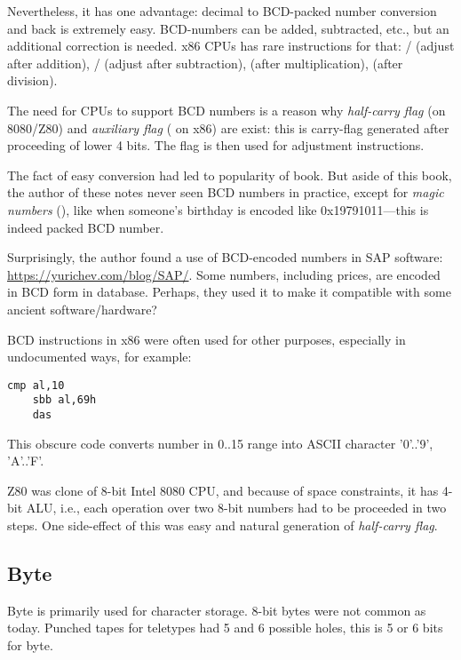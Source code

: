 Nevertheless, it has one advantage: decimal to \ac{BCD}-packed number conversion and back is extremely easy.
BCD-numbers can be added, subtracted, etc., but an additional correction is needed.
x86 CPUs has rare instructions for that:
/ (adjust after addition),
/ (adjust after subtraction),
 (after multiplication),
 (after division).

The need for CPUs to support \ac{BCD} numbers is a reason why \emph{half-carry flag} (on 8080/Z80) and
\emph{auxiliary flag} ( on x86)
are exist: this is carry-flag generated after proceeding of lower 4 bits. The flag is then used for adjustment instructions.

The fact of easy conversion had led to popularity of
 book.
But aside of this book, the author of these notes never seen \ac{BCD} numbers in practice, except for
\emph{magic numbers} (),
like when someone's birthday is encoded like 0x19791011---this is indeed packed \ac{BCD} number.

Surprisingly, the author found a use of \ac{BCD}-encoded numbers in SAP software: \url{https://yurichev.com/blog/SAP/}.
Some numbers, including prices, are encoded in \ac{BCD} form in database.
Perhaps, they used it to make it compatible with some ancient software/hardware?

\ac{BCD} instructions in x86 were often used for other purposes, especially in undocumented ways, for example:

\begin{lstlisting}[style=customasmx86]
	cmp al,10
	sbb al,69h
	das
\end{lstlisting}

This obscure code converts number in 0..15 range into \ac{ASCII} character '0'..'9', 'A'..'F'.


Z80 was clone of 8-bit Intel 8080 CPU, and because of space constraints, it has 4-bit \ac{ALU}, i.e., each operation
over two 8-bit numbers had to be proceeded in two steps.
One side-effect of this was easy and natural generation of \emph{half-carry flag}.

\subsection{Byte}

Byte is primarily used for character storage.
8-bit bytes were not common as today.
Punched tapes for teletypes had 5 and 6 possible holes, this is 5 or 6 bits for byte.

